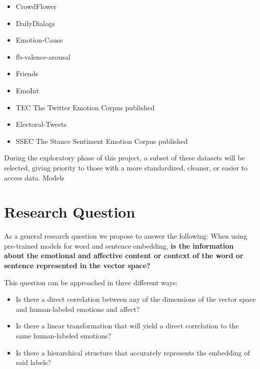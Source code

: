 \begin{itemize}
  \item CrowdFlower %
  \item DailyDialogs~\cite{li2017dailydialog} %
  \item Emotion-Cause~\cite{ghazi2015detecting} %
  \item fb-valence-arousal~\cite{preoctiuc2016modelling} %
  \item Friends~\cite{chen2018emotionlines} %
  \item EmoInt \cite{MohammadB17starsem} %
  \item TEC The Twitter Emotion Corpus published \cite{mohammad2012emotional} %
  \item Electoral-Tweets \cite{mohammad2014semantic} %
  \item SSEC The Stance Sentiment Emotion Corpus published \cite{schuff2017annotation} %
\end{itemize}

During the exploratory phase of this project, a subset of these datasets will be selected, giving priority to those with a more standardized, cleaner, or easier to access data.
Models

\section{Research Question}\label{sec:Research Question}

As a general research question we propose to answer the following:
When using pre-trained models for word and sentence embedding, \textbf{is the information about the emotional and affective content or context of the word or sentence represented in the vector space?}

This question can be approached in three different ways:
\begin{itemize}
  \item Is there a direct correlation between any of the dimensions of the vector space and human-labeled emotions and affect?
  \item Is there a linear transformation that will yield a direct correlation to the same human-labeled emotions?
  \item Is there a hierarchical structure that accurately represents the embedding of said labels?
\end{itemize}
